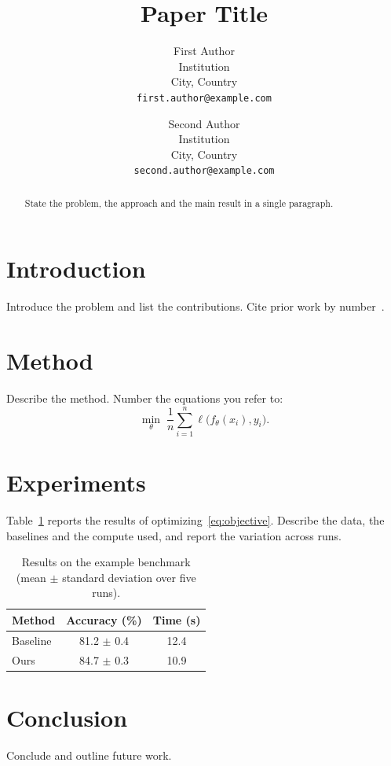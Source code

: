 \documentclass[10pt,twocolumn,letterpaper]{article}
\title{Paper Title}
\author{First Author\\
Institution\\
City, Country\\
{\tt\small first.author@example.com}
\and
Second Author\\
Institution\\
City, Country\\
{\tt\small second.author@example.com}
}
\begin{document}
\maketitle

\begin{abstract}
State the problem, the approach and the main result in a single
paragraph.
\end{abstract}

\section{Introduction}
\label{sec:intro}
Introduce the problem and list the contributions. Cite prior work by
number~\cite{lamport1994latex,knuth1984texbook}.

\section{Method}
\label{sec:method}
Describe the method. Number the equations you refer to:
\begin{equation}
  \label{eq:objective}
  \min_{\theta} \; \frac{1}{n} \sum_{i=1}^{n} \ell\bigl(f_\theta(x_i), y_i\bigr) .
\end{equation}

\section{Experiments}
\label{sec:experiments}
Table~\ref{tab:results} reports the results of
optimizing~\eqref{eq:objective}. Describe the data, the baselines and the
compute used, and report the variation across runs.

\begin{table}[!htb]
  \caption{Results on the example benchmark (mean $\pm$ standard deviation over five runs).}
  \label{tab:results}
  \centering
  \begin{tabular}{lcc}
    \toprule
    Method   & Accuracy (\%)  & Time (s) \\
    \midrule
    Baseline & 81.2 $\pm$ 0.4 & 12.4     \\
    Ours     & 84.7 $\pm$ 0.3 & 10.9     \\
    \bottomrule
  \end{tabular}
\end{table}

\section{Conclusion}
Conclude and outline future work.

{\small

}
\end{document}
